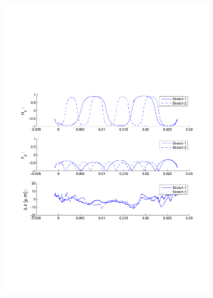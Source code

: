 \begin{figure}[H]

\centering

\includegraphics[width=0.8\textwidth]{Images/Particle 16/Stretch1.pdf}

\end{figure}

